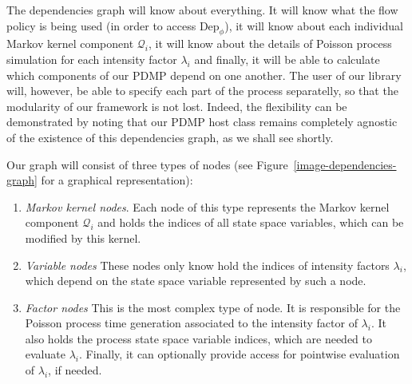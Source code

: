 \documentclass[report.tex]{subfiles}
\begin{document}
The dependencies graph will know about everything.
It will know what the flow policy is being used (in order to access $\text{Dep}_{\phi}$),
it will know about each individual Markov kernel component $\mathcal{Q}_{i}$,
it will know about the details of Poisson process simulation for each intensity
factor $\lambda_{i}$ and finally, it will be able to calculate which components of our PDMP
depend on one another.
The user of our library will, however, be able to specify each part of
the process separatelly, so that the modularity of our framework is not lost.
Indeed, the flexibility can be demonstrated by noting that
our PDMP host class remains completely agnostic of the existence
of this dependencies graph, as we shall see shortly.

Our graph will consist of three types of nodes (see Figure~\ref{image-dependencies-graph}
for a graphical representation):
\begin{enumerate}
  \item \textit{Markov kernel nodes}. Each node of this type represents the Markov
    kernel component $\mathcal{Q}_{i}$ and holds the indices of all state space variables,
    which can be modified by this kernel.
  \item \textit{Variable nodes}
    These nodes only know hold the indices of intensity factors $\lambda_{i}$,
    which depend on the state space variable represented by such a node.
  \item \textit{Factor nodes}
    This is the most complex type of node.
    It is responsible for the Poisson process time generation associated to
    the intensity factor of $\lambda_{i}$. It also holds the process state space
    variable indices, which are needed to evaluate $\lambda_{i}$. Finally, it
    can optionally provide access for pointwise evaluation of $\lambda_{i}$, if
    needed.
\end{enumerate}
\end{document}
